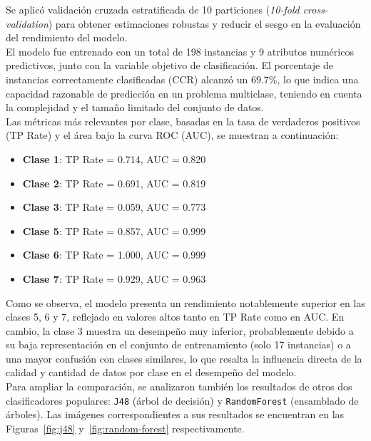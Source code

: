 \documentclass{article}
\begin{document}
Se aplicó validación cruzada estratificada de 10 particiones (\textit{10-fold cross-validation}) para obtener estimaciones robustas y reducir el sesgo en la evaluación del rendimiento del modelo.\\

El modelo fue entrenado con un total de 198 instancias y 9 atributos numéricos predictivos, junto con la variable objetivo de clasificación. El porcentaje de instancias correctamente clasificadas (CCR) alcanzó un 69.7\%, lo que indica una capacidad razonable de predicción en un problema multiclase, teniendo en cuenta la complejidad y el tamaño limitado del conjunto de datos.\\

Las métricas más relevantes por clase, basadas en la tasa de verdaderos positivos (TP Rate) y el área bajo la curva ROC (AUC), se muestran a continuación:\\

\begin{itemize}
    \item \textbf{Clase 1}: TP Rate = 0.714, AUC = 0.820
    \item \textbf{Clase 2}: TP Rate = 0.691, AUC = 0.819
    \item \textbf{Clase 3}: TP Rate = 0.059, AUC = 0.773
    \item \textbf{Clase 5}: TP Rate = 0.857, AUC = 0.999
    \item \textbf{Clase 6}: TP Rate = 1.000, AUC = 0.999
    \item \textbf{Clase 7}: TP Rate = 0.929, AUC = 0.963
\end{itemize}

Como se observa, el modelo presenta un rendimiento notablemente superior en las clases 5, 6 y 7, reflejado en valores altos tanto en TP Rate como en AUC. En cambio, la clase 3 muestra un desempeño muy inferior, probablemente debido a su baja representación en el conjunto de entrenamiento (solo 17 instancias) o a una mayor confusión con clases similares, lo que resalta la influencia directa de la calidad y cantidad de datos por clase en el desempeño del modelo.\\

Para ampliar la comparación, se analizaron también los resultados de otros dos clasificadores populares: \texttt{J48} (árbol de decisión) y \texttt{RandomForest} (ensamblado de árboles). Las imágenes correspondientes a sus resultados se encuentran en las Figuras~\ref{fig:j48} y~\ref{fig:random-forest} respectivamente.\\
\end{document}
